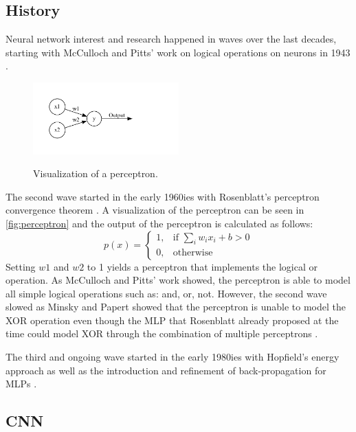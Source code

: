 \documentclass[10pt]{book}
\newcommand{\figureref}[1]{\autoref{#1}}
\begin{document}
\subsection{History}

Neural network interest and research happened in waves over the last decades, starting with McCulloch and Pitts' work on logical operations on neurons in 1943 \cite{mcculloch1943logical,485891}. 

\begin{figure}
  \caption{Visualization of a perceptron.}
  \includegraphics[width=0.5\textwidth]{graph/rosenblatt}
  \label{fig:perceptron}
\end{figure}

The second wave started in the early 1960ies with Rosenblatt's perceptron convergence theorem \cite{rosenblatt1962principles}. A visualization of the perceptron can be seen in \figureref{fig:perceptron} and the output of the perceptron is calculated as follows:
\[
    p(x)= 
\begin{cases}
    1, & \text{if } \sum_i w_ix_i + b > 0\\
    0, & \text{otherwise}
\end{cases}
\]
Setting $w1$ and $w2$ to 1 yields a perceptron that implements the logical or operation. As McCulloch and Pitts' work showed, the perceptron is able to model all simple logical operations such as: and, or, not. However, the second wave slowed as Minsky and Papert showed that the perceptron is unable to model the XOR operation \cite{minsky1969perceptron} even though the \ac{MLP} that Rosenblatt already proposed at the time could model XOR through the combination of multiple perceptrons \cite{schmidhuber2022annotated}.

The third and ongoing wave started in the early 1980ies with Hopfield's energy approach \cite{hopfield1982neural} as well as the introduction and refinement of back-propagation for \acp{MLP} \cite{werbos1974beyond,rumelhart1986parallel}.

\subsection{CNN}
\end{document}
